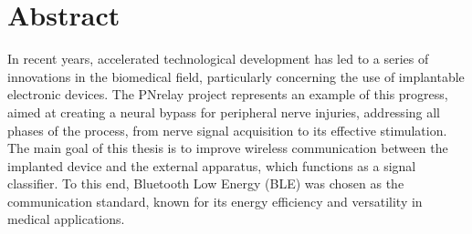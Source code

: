 \documentclass{Configuration_Files/PoliMi3i_thesis}
\begin{document}


\pagestyle{empty} %
\frontmatter %


\startpreamble
\setcounter{page}{1} %

\chapter*{Abstract} 

In recent years, accelerated technological development has led to a series of innovations in the biomedical field, particularly concerning the use of implantable electronic devices. The PNrelay project represents an example of this progress, aimed at creating a neural bypass for peripheral nerve injuries, addressing all phases of the process, from nerve signal acquisition to its effective stimulation. The main goal of this thesis is to improve wireless communication between the implanted device and the external apparatus, which functions as a signal classifier. To this end, Bluetooth Low Energy (BLE) was chosen as the communication standard, known for its energy efficiency and versatility in medical applications.
\end{document}
